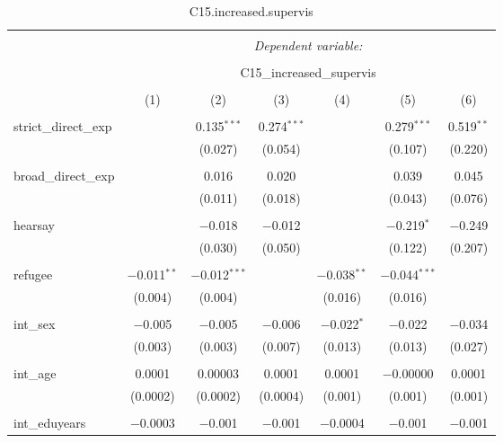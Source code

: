 
\begin{table}[H] \centering 
  \caption{C15.increased.supervis} 
  \label{} 
\tiny 
\begin{tabular}{@{\extracolsep{4pt}}lcccccc} 
\\[-1.8ex]\hline 
\hline \\[-1.8ex] 
 & \multicolumn{6}{c}{\textit{Dependent variable:}} \\ 
\cline{2-7} 
\\[-1.8ex] & \multicolumn{6}{c}{C15\_increased\_supervis} \\ 
\\[-1.8ex] & (1) & (2) & (3) & (4) & (5) & (6)\\ 
\hline \\[-1.8ex] 
 strict\_direct\_exp &  & 0.135$^{***}$ & 0.274$^{***}$ &  & 0.279$^{***}$ & 0.519$^{**}$ \\ 
  &  & (0.027) & (0.054) &  & (0.107) & (0.220) \\ 
  & & & & & & \\ 
 broad\_direct\_exp &  & 0.016 & 0.020 &  & 0.039 & 0.045 \\ 
  &  & (0.011) & (0.018) &  & (0.043) & (0.076) \\ 
  & & & & & & \\ 
 hearsay &  & $-$0.018 & $-$0.012 &  & $-$0.219$^{*}$ & $-$0.249 \\ 
  &  & (0.030) & (0.050) &  & (0.122) & (0.207) \\ 
  & & & & & & \\ 
 refugee & $-$0.011$^{**}$ & $-$0.012$^{***}$ &  & $-$0.038$^{**}$ & $-$0.044$^{***}$ &  \\ 
  & (0.004) & (0.004) &  & (0.016) & (0.016) &  \\ 
  & & & & & & \\ 
 int\_sex & $-$0.005 & $-$0.005 & $-$0.006 & $-$0.022$^{*}$ & $-$0.022 & $-$0.034 \\ 
  & (0.003) & (0.003) & (0.007) & (0.013) & (0.013) & (0.027) \\ 
  & & & & & & \\ 
 int\_age & 0.0001 & 0.00003 & 0.0001 & 0.0001 & $-$0.00000 & 0.0001 \\ 
  & (0.0002) & (0.0002) & (0.0004) & (0.001) & (0.001) & (0.001) \\ 
  & & & & & & \\ 
 int\_eduyears & $-$0.0003 & $-$0.001 & $-$0.001 & $-$0.0004 & $-$0.001 & $-$0.001 \\ 

\end{tabular}
\end{table}

